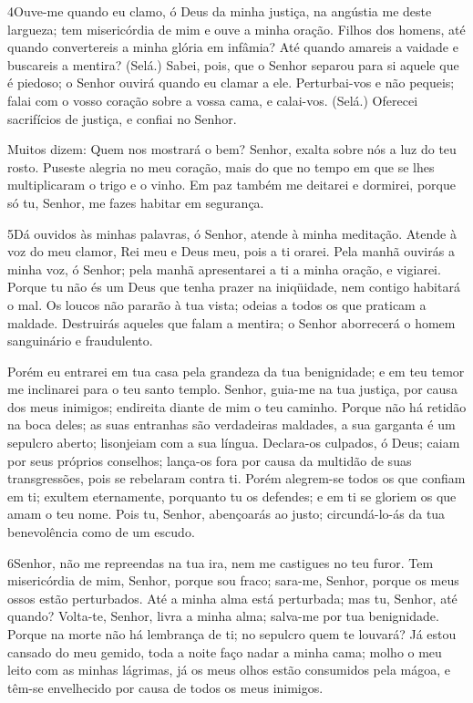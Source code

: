 \bigskip

\lettrine{4}{}Ouve-me quando eu clamo, ó Deus da minha justiça,
na angústia me deste largueza; tem misericórdia de mim e ouve a
minha oração. Filhos dos homens, até quando convertereis a minha
glória em infâmia? Até quando amareis a vaidade e buscareis a
mentira? (Selá.) Sabei, pois, que o Senhor separou para si
aquele que é piedoso; o Senhor ouvirá quando eu clamar a ele.
Perturbai-vos e não pequeis; falai com o vosso coração sobre a
vossa cama, e calai-vos. (Selá.) Oferecei sacrifícios de
justiça, e confiai no Senhor.

Muitos dizem: Quem nos mostrará o bem? Senhor, exalta sobre nós a
luz do teu rosto. Puseste alegria no meu coração, mais do que no
tempo em que se lhes multiplicaram o trigo e o vinho. Em paz
também me deitarei e dormirei, porque só tu, Senhor, me fazes
habitar em segurança.

\bigskip

\lettrine{5}{}Dá ouvidos às minhas palavras, ó Senhor, atende à
minha meditação. Atende à voz do meu clamor, Rei meu e Deus meu,
pois a ti orarei. Pela manhã ouvirás a minha voz, ó Senhor; pela
manhã apresentarei a ti a minha oração, e vigiarei. Porque tu
não és um Deus que tenha prazer na iniqüidade, nem contigo habitará
o mal. Os loucos não pararão à tua vista; odeias a todos os que
praticam a maldade. Destruirás aqueles que falam a mentira; o
Senhor aborrecerá o homem sanguinário e fraudulento.

Porém eu entrarei em tua casa pela grandeza da tua benignidade; e
em teu temor me inclinarei para o teu santo templo. Senhor,
guia-me na tua justiça, por causa dos meus inimigos; endireita
diante de mim o teu caminho. Porque não há retidão na boca
deles; as suas entranhas são verdadeiras maldades, a sua garganta é
um sepulcro aberto; lisonjeiam com a sua língua. Declara-os
culpados, ó Deus; caiam por seus próprios conselhos; lança-os fora
por causa da multidão de suas transgressões, pois se rebelaram
contra ti. Porém alegrem-se todos os que confiam em ti;
exultem eternamente, porquanto tu os defendes; e em ti se gloriem os
que amam o teu nome. Pois tu, Senhor, abençoarás ao justo;
circundá-lo-ás da tua benevolência como de um escudo.

\bigskip

\lettrine{6}{}Senhor, não me repreendas na tua ira, nem me
castigues no teu furor. Tem misericórdia de mim, Senhor, porque
sou fraco; sara-me, Senhor, porque os meus ossos estão perturbados.
Até a minha alma está perturbada; mas tu, Senhor, até quando?
Volta-te, Senhor, livra a minha alma; salva-me por tua
benignidade. Porque na morte não há lembrança de ti; no sepulcro
quem te louvará? Já estou cansado do meu gemido, toda a noite
faço nadar a minha cama; molho o meu leito com as minhas lágrimas,
já os meus olhos estão consumidos pela mágoa, e têm-se
envelhecido por causa de todos os meus inimigos.

